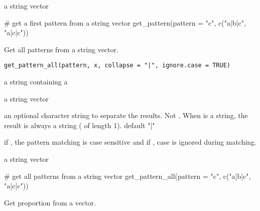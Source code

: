\documentclass[letterpaper]{book}
\begin{document}
%
\begin{Value}
a string vector
\end{Value}
%
\begin{Examples}
\begin{ExampleCode}
# get a first pattern from a string vector
get_pattern(pattern = "c", c("a|b|c", "a|c|c"))

\end{ExampleCode}
\end{Examples}
%
\begin{Description}
Get all patterns from a string vector.
\end{Description}
%
\begin{Usage}
\begin{verbatim}
get_pattern_all(pattern, x, collapse = "|", ignore.case = TRUE)
\end{verbatim}
\end{Usage}
%
\begin{Arguments}
\begin{ldescription}
\item[\code{pattern}] a string containing a 

\item[\code{x}] a string vector

\item[\code{collapse}] an optional character string to separate the results. Not
. When  is a string, the result is always a string
( of length 1). default "|"

\item[\code{ignore.case}] if , the pattern matching is case sensitive and if , case is ignored during matching.
\end{ldescription}
\end{Arguments}
%
\begin{Value}
a string vector
\end{Value}
%
\begin{Examples}
\begin{ExampleCode}
# get all patterns from a string vector
get_pattern_all(pattern = "c", c("a|b|c", "a|c|c"))

\end{ExampleCode}
\end{Examples}
%
\begin{Description}
Get proportion from a vector.
\end{Description}
\end{document}
